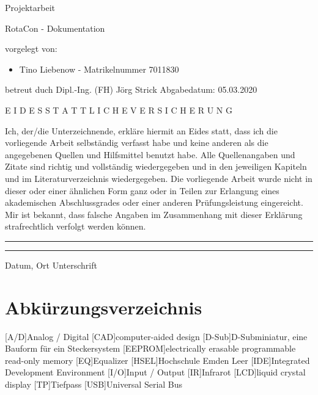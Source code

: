 \documentclass[11pt, titlepage]{report}
\author{Liebenow,Tino}
\date{\textit{<2020-01-26 Sun>}}
\begin{document}
	\begin{titlepage}
	\hsellogo\hfill Projektarbeit
	\par
	\vspace{4cm}
	\noindent\parbox{0.8\textwidth}{\Huge RotaCon - Dokumentation}  
	\vspace{2cm}


	\Large \noindent vorgelegt von:
	\begin{itemize}
		\item Tino Liebenow - Matrikelnummer 7011830
	\end{itemize}
	\vspace{2cm}
	betreut duch\newline
	Dipl.-Ing. (FH) Jörg Strick\newline
	Abgabedatum: 05.03.2020
	\end{titlepage}
	\newpage
	\noindent E I D E S S T A T T L I C H E \hspace{1em} V E R S I C H E R U N G

		Ich, der/die Unterzeichnende, erkläre hiermit an Eides statt, dass ich die vorliegende Arbeit selbständig verfasst habe und keine anderen als die angegebenen Quellen und Hilfsmittel benutzt habe. Alle Quellenangaben und Zitate sind richtig und vollständig wiedergegeben und in den jeweiligen Kapiteln und im Literaturverzeichnis wiedergegeben. Die vorliegende Arbeit wurde nicht in dieser oder einer ähnlichen Form ganz oder in Teilen zur Erlangung eines akademischen Abschlussgrades oder einer anderen Prüfungsleistung eingereicht.  Mir ist bekannt, dass falsche Angaben im Zusammenhang mit dieser Erklärung strafrechtlich verfolgt werden können.

		\vspace{50pt}
		\noindent\rule{5cm}{.4pt}\hfill\rule{5cm}{.4pt}\par
		\noindent Datum, Ort \hfill Unterschrift
	\newpage
	\tableofcontents
	\newpage
	\begingroup
		\renewcommand\clearpage{\relax}
		\listoffigures
		\listoftables
	\endgroup
	\newpage
    \section*{\Huge Abkürzungsverzeichnis}%
    \label{sec:Abkürzungsverzeichnis}
    \vspace{1cm}
	\begin{acronym}
		[A/D]{Analog / Digital}
		[CAD]{computer-aided design}
		[D-Sub]{D-Subminiatur, eine Bauform für ein Steckersystem}
		[EEPROM]{electrically erasable programmable read-only memory}
		[EQ]{Equalizer}
		{Hochschule Emden Leer}
		[IDE]{Integrated Development Environment}
		[I/O]{Input / Output}
		[IR]{Infrarot}
		[LCD]{liquid crystal display}
		[TP]{Tiefpass}
		[USB]{Universal Serial Bus}
    \end{acronym}
	\newpage
\end{document}
